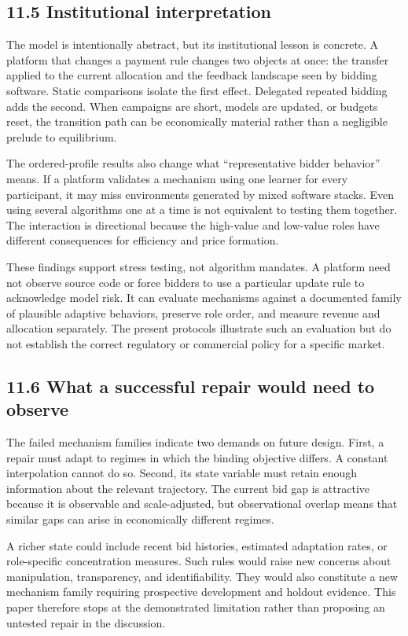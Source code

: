 \documentclass[11pt]{article}
\begin{document}
\subsection{11.5 Institutional interpretation}
The model is intentionally abstract, but its institutional lesson is concrete. A platform that changes a payment rule changes two objects at once: the transfer applied to the current allocation and the feedback landscape seen by bidding software. Static comparisons isolate the first effect. Delegated repeated bidding adds the second. When campaigns are short, models are updated, or budgets reset, the transition path can be economically material rather than a negligible prelude to equilibrium.

The ordered-profile results also change what “representative bidder behavior” means. If a platform validates a mechanism using one learner for every participant, it may miss environments generated by mixed software stacks. Even using several algorithms one at a time is not equivalent to testing them together. The interaction is directional because the high-value and low-value roles have different consequences for efficiency and price formation.

These findings support stress testing, not algorithm mandates. A platform need not observe source code or force bidders to use a particular update rule to acknowledge model risk. It can evaluate mechanisms against a documented family of plausible adaptive behaviors, preserve role order, and measure revenue and allocation separately. The present protocols illustrate such an evaluation but do not establish the correct regulatory or commercial policy for a specific market.

\subsection{11.6 What a successful repair would need to observe}
The failed mechanism families indicate two demands on future design. First, a repair must adapt to regimes in which the binding objective differs. A constant interpolation cannot do so. Second, its state variable must retain enough information about the relevant trajectory. The current bid gap is attractive because it is observable and scale-adjusted, but observational overlap means that similar gaps can arise in economically different regimes.

A richer state could include recent bid histories, estimated adaptation rates, or role-specific concentration measures. Such rules would raise new concerns about manipulation, transparency, and identifiability. They would also constitute a new mechanism family requiring prospective development and holdout evidence. This paper therefore stops at the demonstrated limitation rather than proposing an untested repair in the discussion.
\end{document}
